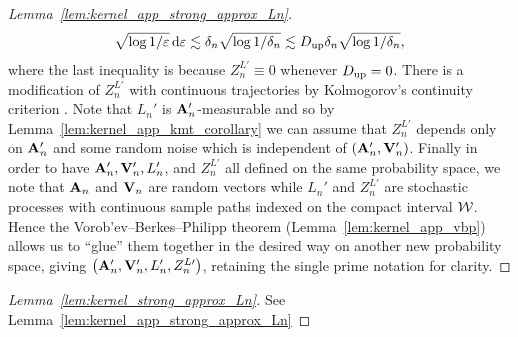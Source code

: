 \begin{proof}[Lemma~\ref{lem:kernel_app_strong_approx_Ln}]
\begin{align*}
    \sqrt{\log 1/\varepsilon}
    \,\mathrm{d}\varepsilon
    \lesssim
    \delta_n \sqrt{\log 1/\delta_n}
    \lesssim
    D_{\textup{up}}
    \delta_n \sqrt{\log 1/\delta_n},
  \end{align*}
  where the last inequality is because
  $Z_n^{L\prime} \equiv 0$ whenever $D_{\textup{up}} = 0$.
  There is a modification of $Z_n^{L\prime}$
  with continuous trajectories
  by Kolmogorov's continuity criterion
  \citep[Theorem~2.9]{legall2016brownian}.
  Note that $L_n'$ is $\mathbf{A}_n'$-measurable
  and so by Lemma~\ref{lem:kernel_app_kmt_corollary}
  we can assume that $Z_n^{L\prime}$
  depends only on $\mathbf{A}_n'$ and some
  random noise which is independent of
  $(\mathbf{A}_n', \mathbf{V}_n')$.
  Finally in order to have
  $\mathbf{A}_n', \mathbf{V}_n', L_n'$, and $Z_n^{L\prime}$
  all defined on the same probability space,
  we note that $\mathbf{A}_n$ and $\mathbf{V}_n$ are random vectors
  while $L_n'$ and $Z_n^{L\prime}$
  are stochastic processes
  with continuous sample paths
  indexed on
  the compact interval $\mathcal{W}$.
  Hence the Vorob'ev--Berkes--Philipp theorem
  (Lemma~\ref{lem:kernel_app_vbp})
  allows us to ``glue'' them together
  in the desired way
  on another new probability space, giving
  $\big(\mathbf{A}_n', \mathbf{V}_n', L_n', Z_n^{L\prime}\big)$,
  retaining the single prime notation for clarity.
\end{proof}

\begin{proof}[Lemma~\ref{lem:kernel_strong_approx_Ln}]
  See Lemma~\ref{lem:kernel_app_strong_approx_Ln}
\end{proof}

